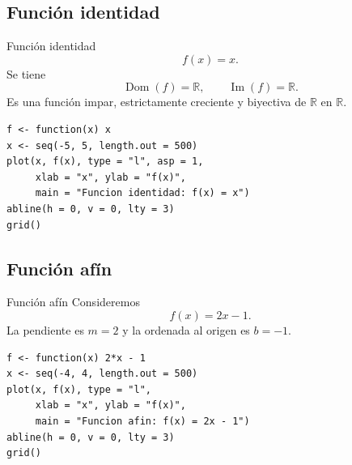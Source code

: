 \documentclass[aspectratio=169,10pt]{beamer}
\newcommand{\R}{\mathbb{R}}
\newcommand{\Dom}{\operatorname{Dom}}
\newcommand{\Ima}{\operatorname{Im}}
\begin{document}
\subsection{Función identidad}
\begin{frame}{Función identidad}
\[
f(x)=x.
\]
Se tiene
\[
\Dom(f)=\R,\qquad \Ima(f)=\R.
\]
Es una función impar, estrictamente creciente y biyectiva de $\R$ en $\R$.

\begin{center}
\end{center}

\begin{verbatim}
f <- function(x) x
x <- seq(-5, 5, length.out = 500)
plot(x, f(x), type = "l", asp = 1,
     xlab = "x", ylab = "f(x)",
     main = "Funcion identidad: f(x) = x")
abline(h = 0, v = 0, lty = 3)
grid()
\end{verbatim}

\end{frame}
\subsection{Función afín}
\begin{frame}{Función afín}
Consideremos
\[
f(x)=2x-1.
\]
La pendiente es $m=2$ y la ordenada al origen es $b=-1$.

\begin{center}
\end{center}

\begin{verbatim}
f <- function(x) 2*x - 1
x <- seq(-4, 4, length.out = 500)
plot(x, f(x), type = "l",
     xlab = "x", ylab = "f(x)",
     main = "Funcion afin: f(x) = 2x - 1")
abline(h = 0, v = 0, lty = 3)
grid()
\end{verbatim}

\end{frame}
\end{document}
